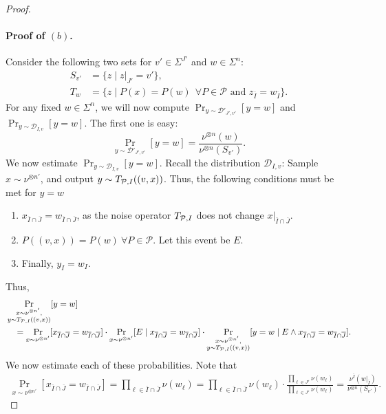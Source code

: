 \documentclass[10pt,a4paper]{amsart}
\begin{document}
\begin{proof}
\paragraph{Proof of $(b)$.}
Consider the following two sets for $v'\in \Sigma^{J'}$ and $w\in \Sigma^n$:
\begin{align*}
    S_{v'} &= \{ z \mid z|_{J'} = v'\},\\
    T_w &= \{z\mid P(x) = P(w) ~~\forall P\in \mathcal{P} \mbox{ and } z_{\overline{I}} = w_{\overline{I}}\}.
\end{align*}
For any fixed $w\in \Sigma^n$, we will now compute $\Pr_{y\sim \mathcal{D}'_{J', v'}}[y=w]$ and $\Pr_{y\sim \mathcal{D}_{I,v}}[y=w]$. The first one is easy:
$$\Pr_{y\sim \mathcal{D'}_{J', v'}}[y=w] = \frac{\nu^{\otimes n}(w)}{\nu^{\otimes n}(S_{v'})}.$$
We now estimate $\Pr_{y\sim \mathcal{D}_{I,v}}[y=w]$. Recall the distribution $\mathcal{D}_{I,v}$: Sample $x\sim \nu^{\otimes n'}$, and output $y\sim {\rm T}_{\mathcal{P},I} ((v, x))$. Thus, the following conditions must be met for $y=w$
\begin{enumerate}
    \item $x_{\overline{I}\cap \overline{J}} = w_{\overline{I}\cap \overline{J}}$, as the noise operator ${\rm T}_{\mathcal{P},I}$ does not change $x|_{\overline{I}\cap \overline{J}}$. 
    \item $P((v,x)) = P(w) ~\forall P\in \mathcal{P}$. Let this event be $E$.
    \item Finally, $y_{I} = w_{I}$.
\end{enumerate}
Thus,
\begin{align*}
    &\Pr_{\substack{x\sim \nu^{\otimes n'},\\ y\sim {\rm T}_{\mathcal{P},I} ((v, x))}}[y=w] \\
    &\quad= \Pr_{x\sim \nu^{\otimes n'}}[x_{\overline{I}\cap \overline{J}} = w_{\overline{I}\cap \overline{J}}]\cdot \Pr_{x\sim \nu^{\otimes n'}}[ E \mid x_{\overline{I}\cap \overline{J}} = w_{\overline{I}\cap \overline{J}}] \cdot  \Pr_{\substack{x\sim \nu^{\otimes n'},\\ y\sim {\rm T}_{\mathcal{P},I} ((v, x))}}[y=w \mid E \wedge x_{\overline{I}\cap \overline{J}} = w_{\overline{I}\cap \overline{J}}].
\end{align*}
We now estimate each of these probabilities. Note that
\begin{align*}
    \Pr_{x\sim \nu^{\otimes n'}}[x_{\overline{I}\cap \overline{J}} = w_{\overline{I}\cap \overline{J}}] = \prod_{\ell\in \overline{I}\cap \overline{J} } \nu(w_\ell) = \prod_{\ell\in \overline{I}\cap \overline{J} } \nu(w_\ell)  \cdot \frac{\prod_{\ell\in J'} \nu(w_\ell) }{\prod_{\ell\in J'} \nu(w_\ell) } = \frac{\nu^{\bar{I}}(w|_{\overline{I}})}{\nu^{\otimes n}(S_{v'})}.

\end{align*}
\end{proof}
\end{document}
